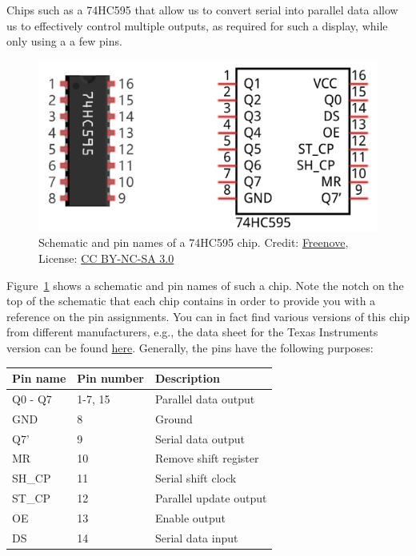 Chips such as a 74HC595 that allow us to convert serial into parallel data allow us to effectively control multiple outputs, as required for such a display, while only using a a few pins.
\begin{figure}[tb]
    \centering
    \includegraphics[]{graphics/02_display/74hc595.png}
    \caption{Schematic and pin names of a 74HC595 chip. Credit: \href{https://github.com/Freenove/Freenove_Ultimate_Starter_Kit}{Freenove}, License: \href{https://www.creativecommons.org/licenses/by-nc-sa/3.0/deed.en_US}{CC BY-NC-SA 3.0}}
    \label{fig:display:74hc595}
\end{figure}
Figure~\ref{fig:display:74hc595} shows a schematic and pin names of such a chip. Note the notch on the top of the schematic that each chip contains in order to provide you with a reference on the pin assignments. You can in fact find various versions of this chip from different manufacturers, e.g., the data sheet for the Texas Instruments version can be found \href{https://www.ti.com/lit/ds/symlink/sn74hc595.pdf?ts=1636228778140&ref_url=https%253A%252F%252Fwww.google.com%252F}{here}. Generally, the pins have the following purposes:

\begin{center}
\begin{tabular}{lll}
    \hline
    \textbf{Pin name}   &   \textbf{Pin number} &   \textbf{Description}    \\
    \hline \hline
    Q0 - Q7             &   1-7, 15             &   Parallel data output \\
    GND                 &   8                   &   Ground \\
    Q7'                 &   9                   &   Serial data output \\
    MR                  &   10                  &   Remove shift register \\
    SH\_CP              &   11                  &   Serial shift clock \\
    ST\_CP              &   12                  &   Parallel update output \\
    OE                  &   13                  &   Enable output \\
    DS                  &   14                  &   Serial data input \\
    \hline
\end{tabular}
\end{center}


